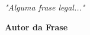 %
%
\begin{epigrafe}
    \begin{flushright}
        \textit{"Alguma frase legal..."}
        \\ \vspace{\baselineskip}
        
        \textbf{Autor da Frase}
    \end{flushright}
\end{epigrafe}


